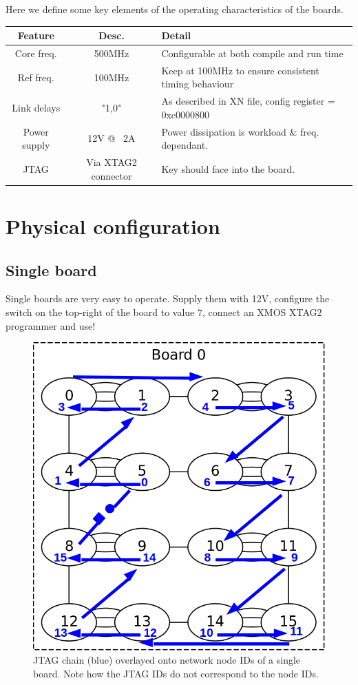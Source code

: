 \documentclass[12pt,a4paper,final,twoside]{article}
\begin{document}
Here we define some key elements of the operating characteristics of the boards.

\begin{tabular}{|c|c|p{2.5in}|}
\hline 
\textbf{Feature} & \textbf{Desc.} & \textbf{Detail} \\ 
\hline 
Core freq. & 500MHz & Configurable at both compile and run time \\ 
\hline 
Ref freq. & 100MHz & Keep at 100MHz to ensure consistent timing behaviour \\ 
\hline 
Link delays & "1,0" & As described in XN file, config register = 0xc0000800 \\ 
\hline 
Power supply & 12V @ ~2A & Power dissipation is workload \& freq. dependant. \\ 
\hline
JTAG & Via XTAG2 connector & Key should face into the board. \\
\hline 
\end{tabular}

\section{Physical configuration}

\subsection{Single board}

Single boards are very easy to operate. Supply them with 12V, configure the switch on the top-right of the board to value $7$, connect an XMOS XTAG2 programmer and use!

\begin{figure}[htbp]
\centering
\includegraphics[scale=0.5]{jtag-single.png}
\caption{JTAG chain (blue) overlayed onto network node IDs of a single board. Note how the JTAG IDs do not correspond to the node IDs.}
\end{figure}
\end{document}
